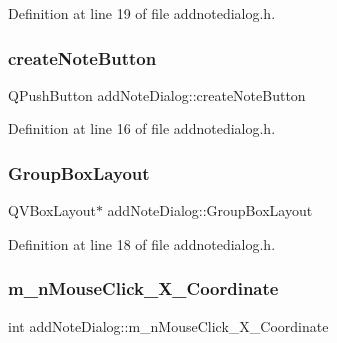 Definition at line 19 of file addnotedialog.\+h.

\hypertarget{classaddNoteDialog_ae424f90e2d41fa5ec323d4c93a91f527}{}\label{classaddNoteDialog_ae424f90e2d41fa5ec323d4c93a91f527} 
\subsubsection{\texorpdfstring{create\+Note\+Button}{createNoteButton}}
{\footnotesize\ttfamily Q\+Push\+Button add\+Note\+Dialog\+::create\+Note\+Button}



Definition at line 16 of file addnotedialog.\+h.

\hypertarget{classaddNoteDialog_aec3ffbbf5c9ceebc839678cb1c842499}{}\label{classaddNoteDialog_aec3ffbbf5c9ceebc839678cb1c842499} 
\subsubsection{\texorpdfstring{Group\+Box\+Layout}{GroupBoxLayout}}
{\footnotesize\ttfamily Q\+V\+Box\+Layout$\ast$ add\+Note\+Dialog\+::\+Group\+Box\+Layout}



Definition at line 18 of file addnotedialog.\+h.

\hypertarget{classaddNoteDialog_af54413cf6c84a6610266d9c616f44541}{}\label{classaddNoteDialog_af54413cf6c84a6610266d9c616f44541} 
\subsubsection{\texorpdfstring{m\+\_\+n\+Mouse\+Click\+\_\+\+X\+\_\+\+Coordinate}{m\_nMouseClick\_X\_Coordinate}}
{\footnotesize\ttfamily int add\+Note\+Dialog\+::m\+\_\+n\+Mouse\+Click\+\_\+\+X\+\_\+\+Coordinate\hspace{0.3cm}{\ttfamily [private]}}




